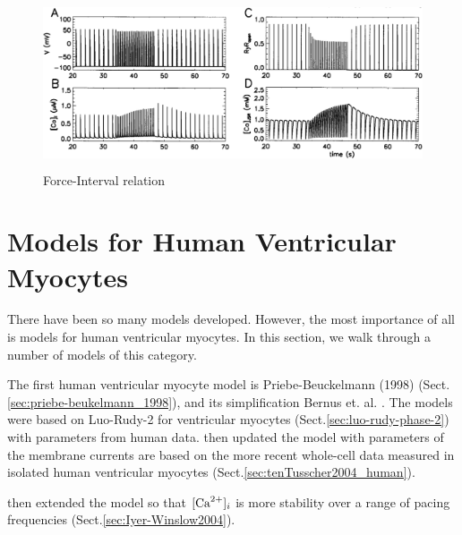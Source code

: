 \begin{figure}[hbt]
  \centerline{\includegraphics[height=5cm]{./images/Jafri1998_Fig8.eps}}
  \caption{Force-Interval relation}
  \label{fig:Jafri1998_Fig8}
\end{figure}



\section{Models for Human Ventricular Myocytes}

There have been so many models developed. However, the most importance of all
is models for human ventricular myocytes. In this section, we walk through a
number of models of this category.

The first human ventricular myocyte model is Priebe-Beuckelmann (1998)
(Sect.\ref{sec:priebe-beukelmann_1998}), and its simplification Bernus et. al. 
\citep{bernus2002}. The models were based on Luo-Rudy-2 for ventricular myocytes
(Sect.\ref{sec:luo-rudy-phase-2}) with parameters from human data.
\citep{tenTusscher2004} then updated the model with parameters of the membrane
currents are based on the more recent whole-cell data measured in isolated human
ventricular myocytes (Sect.\ref{sec:tenTusscher2004_human}). 

\citep{iyer2004} then extended the model so that $[{\text{Ca}^{2+}}]_i$ is more stability
over a range of pacing frequencies (Sect.\ref{sec:Iyer-Winslow2004}). 

